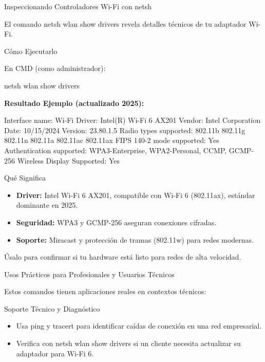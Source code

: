 \documentclass[
  doc,
  floatsintext,
  longtable,
  a4paper,
  nolmodern,
  notxfonts,
  notimes,
  12pt,
  colorlinks=true,linkcolor=blue,citecolor=blue,urlcolor=blue]{apa7}
\newenvironment{Shaded}{\begin{snugshade}}{\end{snugshade}}
\newcommand{\NormalTok}[1]{\textcolor[rgb]{0.00,0.23,0.31}{#1}}
\providecommand{\tightlist}{%
  \setlength{\itemsep}{0pt}\setlength{\parskip}{0pt}}
\begin{document}
Inspeccionando Controladores Wi-Fi con netsh

El comando netsh wlan show drivers revela detalles técnicos de tu
adaptador Wi-Fi.

Cómo Ejecutarlo

En CMD (como administrador):

\begin{Shaded}
\begin{Highlighting}[]
\NormalTok{netsh wlan show drivers}
\end{Highlighting}
\end{Shaded}

\textbf{Resultado Ejemplo (actualizado 2025):}

\begin{Shaded}
\begin{Highlighting}[]
\NormalTok{Interface name: Wi{-}Fi}
\NormalTok{Driver: Intel(R) Wi{-}Fi 6 AX201}
\NormalTok{Vendor: Intel Corporation}
\NormalTok{Date: 10/15/2024}
\NormalTok{Version: 23.80.1.5}
\NormalTok{Radio types supported: 802.11b 802.11g 802.11n 802.11a 802.11ac 802.11ax}
\NormalTok{FIPS 140{-}2 mode supported: Yes}
\NormalTok{Authentication supported: WPA3{-}Enterprise, WPA2{-}Personal, CCMP, GCMP{-}256}
\NormalTok{Wireless Display Supported: Yes}
\end{Highlighting}
\end{Shaded}

Qué Significa

\begin{itemize}
\tightlist
\item
  \textbf{Driver:} Intel Wi-Fi 6 AX201, compatible con Wi-Fi 6
  (802.11ax), estándar dominante en 2025.
\item
  \textbf{Seguridad:} WPA3 y GCMP-256 aseguran conexiones cifradas.
\item
  \textbf{Soporte:} Miracast y protección de tramas (802.11w) para redes
  modernas.
\end{itemize}

Úsalo para confirmar si tu hardware está listo para redes de alta
velocidad.

Usos Prácticos para Profesionales y Usuarios Técnicos

Estos comandos tienen aplicaciones reales en contextos técnicos:

Soporte Técnico y Diagnóstico

\begin{itemize}
\tightlist
\item
  Usa ping y tracert para identificar caídas de conexión en una red
  empresarial.
\item
  Verifica con netsh wlan show drivers si un cliente necesita actualizar
  su adaptador para Wi-Fi 6.
\end{itemize}
\end{document}
